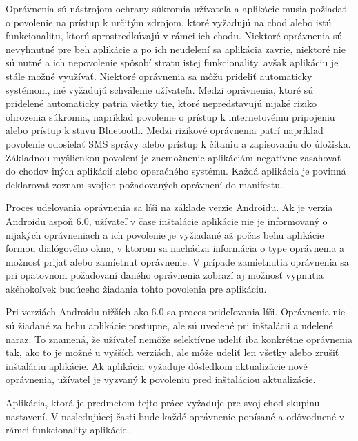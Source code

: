 Oprávnenia sú nástrojom ochrany súkromia užívateľa a aplikácie musia požiadať o povolenie na prístup k určitým zdrojom, ktoré vyžadujú na chod alebo istú funkcionalitu, ktorú sprostredkúvajú v rámci ich chodu. Niektoré oprávnenia sú nevyhnutné pre beh aplikácie a po ich neudelení sa aplikácia zavrie, niektoré nie sú nutné a ich nepovolenie spôsobí stratu istej funkcionality, avšak aplikáciu je stále možné využívať. Niektoré oprávnenia sa môžu prideliť automaticky systémom, iné vyžadujú schválenie užívateľa. Medzi oprávnenia, ktoré sú pridelené automaticky patria všetky tie, ktoré nepredstavujú nijaké riziko ohrozenia súkromia, napríklad povolenie o prístup k internetovému pripojeniu alebo prístup k stavu Bluetooth. Medzi rizikové oprávnenia patrí napríklad povolenie odosielať SMS správy alebo prístup k čítaniu a zapisovaniu do úložiska. Základnou myšlienkou povolení je znemožnenie aplikáciám negatívne zasahovať do chodov iných aplikácií alebo operačného systému. Každá aplikácia je povinná deklarovať zoznam svojich požadovaných oprávnení do manifestu. 

Proces udeľovania oprávnenia sa líši na základe verzie Androidu. Ak je verzia Androidu aspoň 6.0, užívateľ v čase inštalácie aplikácie nie je informovaný o nijakých oprávneniach a ich povolenie je vyžiadané až počas behu aplikácie formou dialógového okna, v ktorom sa nachádza informácia o type oprávnenia a možnosť prijať alebo zamietnuť oprávnenie. V prípade zamietnutia oprávnenia sa pri opätovnom požadovaní daného oprávnenia zobrazí aj možnosť vypnutia akéhokoľvek budúceho žiadania tohto povolenia pre aplikáciu. 

Pri verziách Androidu nižších ako 6.0 sa proces prideľovania líši. Oprávnenia nie sú žiadané za behu aplikácie postupne, ale sú uvedené pri inštalácii a udelené naraz. To znamená, že užívateľ nemôže selektívne udeliť iba konkrétne oprávnenia tak, ako to je možné u vyšších verziách, ale môže udeliť len všetky alebo zrušiť inštaláciu aplikácie. Ak aplikácia vyžaduje dôsledkom aktualizácie nové oprávnenia, užívateľ je vyzvaný k povoleniu pred inštaláciou aktualizácie. 

Aplikácia, ktorá je predmetom tejto práce vyžaduje pre svoj chod skupinu nastavení. V nasledujúcej časti bude každé oprávnenie popísané a odôvodnené v rámci funkcionality aplikácie.

